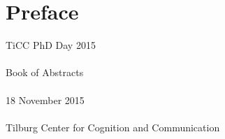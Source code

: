 \chapter*{Preface}
\thispagestyle{empty}

TiCC PhD Day 2015
\\ \\
Book of Abstracts
\\ \\
18 November 2015
\\ \\
Tilburg Center for Cognition and Communication
\newpage
